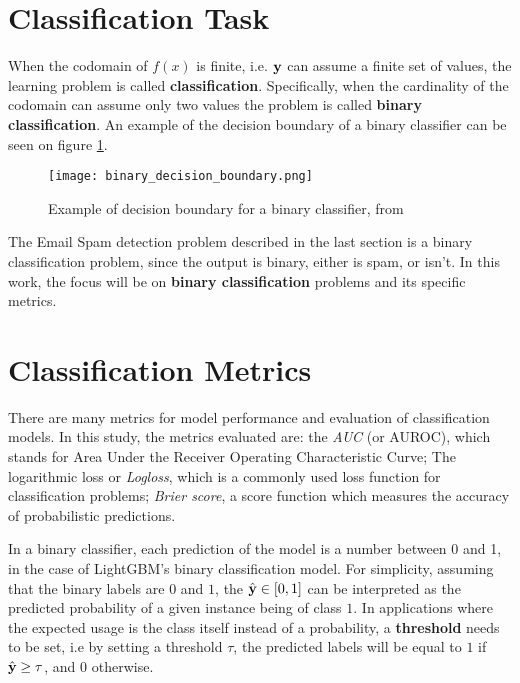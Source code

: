 \section{Classification Task}

When the codomain of $f(x)$ is finite, i.e. $\textbf{\text{\textup{y}}}$ can assume a finite set of values, the learning problem is called \textbf{classification}. Specifically, when the cardinality of the codomain can assume only two values the problem is called \textbf{binary classification}. An example of the decision boundary of a binary classifier can be seen on figure  \ref{fig:binaryclassifier}.

\begin{figure}[!h]
    \centering
    \texttt{[image: binary\_decision\_boundary.png]} 
    \caption{Example of decision boundary for a binary classifier, from \cite{hastie2009elements}}
    \label{fig:binaryclassifier}
\end{figure}

The Email Spam detection problem described in the last section is a binary classification problem, since the output is binary, either is spam, or isn't. In this work, the focus will be on \textbf{binary classification} problems and its specific metrics.

\section{Classification Metrics}
\label{classification-metrics}

There are many metrics for model performance and evaluation of classification models. In this study, the metrics evaluated are: the \textit{AUC} (or AUROC), which stands for Area Under the Receiver Operating Characteristic Curve; The logarithmic loss or \textit{Logloss}, which is a commonly used loss function for classification problems; \textit{Brier score}, a score function which measures the accuracy of probabilistic predictions.

In a binary classifier, each prediction of the model is a number between 0 and 1, in the case of LightGBM's binary classification model. For simplicity, assuming that the binary labels are $0$ and $1$, the $\hat{\textbf{{\text{\textup{y}}}}}\in [0, 1]$ can be interpreted as the predicted probability of a given instance being of class $1$. In applications where the expected usage is the class itself instead of a probability, a \textbf{threshold} needs to be set, i.e by setting a threshold $\tau$, the predicted labels will be equal to $1$ if $\hat{\textbf{{\text{\textup{y}}}}} \geq \tau$, and $0$ otherwise.

